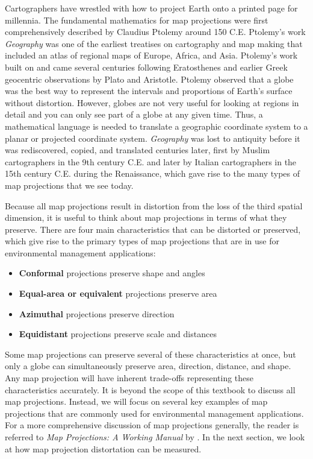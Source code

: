 \documentclass[
]{book}
\providecommand{\tightlist}{%
  \setlength{\itemsep}{0pt}\setlength{\parskip}{0pt}}
\begin{document}
Cartographers have wrestled with how to project Earth onto a printed page for millennia. The fundamental mathematics for map projections were first comprehensively described by Claudius Ptolemy around 150 C.E. Ptolemy's work \emph{Geography} was one of the earliest treatises on cartography and map making that included an atlas of regional maps of Europe, Africa, and Asia. Ptolemy's work built on and came several centuries following Eratosthenes and earlier Greek geocentric observations by Plato and Aristotle. Ptolemy observed that a globe was the best way to represent the intervals and proportions of Earth's surface without distortion. However, globes are not very useful for looking at regions in detail and you can only see part of a globe at any given time. Thus, a mathematical language is needed to translate a geographic coordinate system to a planar or projected coordinate system. \emph{Geography} was lost to antiquity before it was rediscovered, copied, and translated centuries later, first by Muslim cartographers in the 9th century C.E. and later by Italian cartographers in the 15th century C.E. during the Renaissance, which gave rise to the many types of map projections that we see today.

Because all map projections result in distortion from the loss of the third spatial dimension, it is useful to think about map projections in terms of what they preserve. There are four main characteristics that can be distorted or preserved, which give rise to the primary types of map projections that are in use for environmental management applications:

\begin{itemize}
\tightlist
\item
  \textbf{Conformal} projections preserve shape and angles
\item
  \textbf{Equal-area or equivalent} projections preserve area
\item
  \textbf{Azimuthal} projections preserve direction
\item
  \textbf{Equidistant} projections preserve scale and distances
\end{itemize}

Some map projections can preserve several of these characteristics at once, but only a globe can simultaneously preserve area, direction, distance, and shape. Any map projection will have inherent trade-offs representing these characteristics accurately. It is beyond the scope of this textbook to discuss all map projections. Instead, we will focus on several key examples of map projections that are commonly used for environmental management applications. For a more comprehensive discussion of map projections generally, the reader is referred to \emph{Map Projections: A Working Manual} by \citep{snyder_map_1987}. In the next section, we look at how map projection distortation can be measured.
\end{document}
